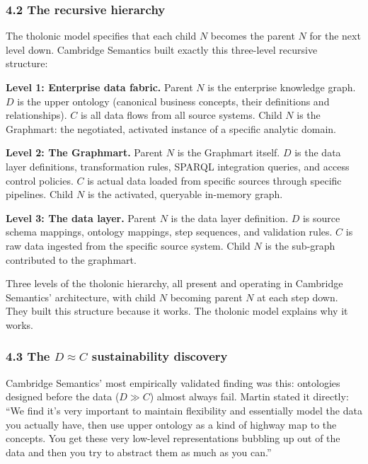 \documentclass[
  11pt,
  letterpaper,
]{article}
\begin{document}
\subsubsection{4.2 The recursive
hierarchy}\label{the-recursive-hierarchy}

The tholonic model specifies that each child \(N\) becomes the parent
\(N\) for the next level down. Cambridge Semantics built exactly this
three-level recursive structure:

\textbf{Level 1: Enterprise data fabric.} Parent \(N\) is the enterprise
knowledge graph. \(D\) is the upper ontology (canonical business
concepts, their definitions and relationships). \(C\) is all data flows
from all source systems. Child \(N\) is the Graphmart: the negotiated,
activated instance of a specific analytic domain.

\textbf{Level 2: The Graphmart.} Parent \(N\) is the Graphmart itself.
\(D\) is the data layer definitions, transformation rules, SPARQL
integration queries, and access control policies. \(C\) is actual data
loaded from specific sources through specific pipelines. Child \(N\) is
the activated, queryable in-memory graph.

\textbf{Level 3: The data layer.} Parent \(N\) is the data layer
definition. \(D\) is source schema mappings, ontology mappings, step
sequences, and validation rules. \(C\) is raw data ingested from the
specific source system. Child \(N\) is the sub-graph contributed to the
graphmart.

Three levels of the tholonic hierarchy, all present and operating in
Cambridge Semantics' architecture, with child \(N\) becoming parent
\(N\) at each step down. They built this structure because it works. The
tholonic model explains why it works.

\subsubsection{\texorpdfstring{4.3 The \(D \approx C\) sustainability
discovery}{4.3 The D \textbackslash approx C sustainability discovery}}\label{the-d-approx-c-sustainability-discovery}

Cambridge Semantics' most empirically validated finding was this:
ontologies designed before the data (\(D \gg C\)) almost always fail.
Martin stated it directly: ``We find it's very important to maintain
flexibility and essentially model the data you actually have, then use
upper ontology as a kind of highway map to the concepts. You get these
very low-level representations bubbling up out of the data and then you
try to abstract them as much as you can.''
\end{document}
